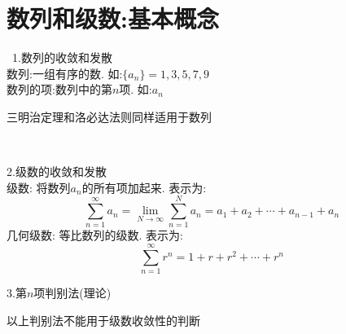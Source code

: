 \chapter{数列和级数:基本概念}\
1.数列的收敛和发散\\
数列:一组有序的数. 如:$\{a_n\}=1,3,5,7,9$\\
数列的项:数列中的第$n$项. 如:$a_n$\\
\begin{center}
\end{center}

三明治定理和洛必达法则同样适用于数列\\
\begin{center}
\\[2ex]
\end{center}\vspace{4ex}

2.级数的收敛和发散\\
级数: 将数列${a_n}$的所有项加起来. 表示为:\\
\[\sum_{n=1}^{\infty}a_n=\lim_{N\to\infty}\sum_{n=1}^Na_n=a_1+a_2+\cdots+a_{n-1}+a_n\]
几何级数: 等比数列的级数. 表示为:\\
\[\sum_{n=1}^{\infty}r^n=1+r+r^2+\cdots+r^n\]
\begin{center}
\end{center}\vspace{4ex}

3.第$n$项判别法(理论)\\
\begin{center}
\end{center}
以上判别法不能用于级数收敛性的判断\\[4ex]

